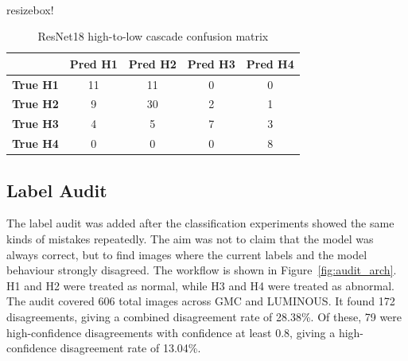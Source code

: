 \begin{table}[H]
\centering
\scriptsize
\\resizebox{\textwidth}{!}{%
\begin{tabular}{lcccc}
\toprule
 & \textbf{Pred H1} & \textbf{Pred H2} & \textbf{Pred H3} & \textbf{Pred H4} \\
\midrule
\textbf{True H1} & 11 & 11 & 0 & 0 \\
\textbf{True H2} & 9 & 30 & 2 & 1 \\
\textbf{True H3} & 4 & 5 & 7 & 3 \\
\textbf{True H4} & 0 & 0 & 0 & 8 \\
\bottomrule
\end{tabular}}
\caption{ResNet18 high-to-low cascade confusion matrix}
\label{tab:resnet_high_low_cm}
\end{table}

\subsection{Label Audit}
The label audit was added after the classification experiments showed the same kinds of mistakes repeatedly. The aim was not to claim that the model was always correct, but to find images where the current labels and the model behaviour strongly disagreed. The workflow is shown in Figure~\ref{fig:audit_arch}. H1 and H2 were treated as normal, while H3 and H4 were treated as abnormal. The audit covered 606 total images across GMC and LUMINOUS. It found 172 disagreements, giving a combined disagreement rate of 28.38\%. Of these, 79 were high-confidence disagreements with confidence at least 0.8, giving a high-confidence disagreement rate of 13.04\%.

\begin{table}[H]
\centering
\scriptsize
{}
\caption{Combined GMC and LUMINOUS image audit summary}
\label{tab:audit_summary}
\end{table}

